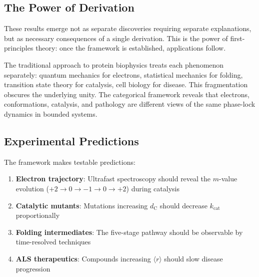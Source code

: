 \documentclass[twocolumn,aps,prx,superscriptaddress,longbibliography]{revtex4-2}
\theoremstyle{remark}
\newcommand{\kcat}{k_\text{cat}}
\newcommand{\dC}{d_\text{C}}
\newcommand{\orderpar}{\langle r \rangle}
\begin{document}
\subsection{The Power of Derivation}

These results emerge not as separate discoveries requiring separate
explanations, but as necessary consequences of a single derivation.
This is the power of first-principles theory: once the framework is
established, applications follow.

The traditional approach to protein biophysics treats each phenomenon
separately: quantum mechanics for electrons, statistical mechanics for
folding, transition state theory for catalysis, cell biology for disease.
This fragmentation obscures the underlying unity. The categorical
framework reveals that electrons, conformations, catalysis, and
pathology are different views of the same phase-lock dynamics in
bounded systems.

\subsection{Experimental Predictions}

The framework makes testable predictions:

\begin{enumerate}
    \item \textbf{Electron trajectory}: Ultrafast spectroscopy should
    reveal the $m$-value evolution ($+2 \to 0 \to -1 \to 0 \to +2$)
    during catalysis

    \item \textbf{Catalytic mutants}: Mutations increasing $\dC$ should
    decrease $\kcat$ proportionally

    \item \textbf{Folding intermediates}: The five-stage pathway should
    be observable by time-resolved techniques

    \item \textbf{ALS therapeutics}: Compounds increasing $\orderpar$
    should slow disease progression
\end{enumerate}
\end{document}
